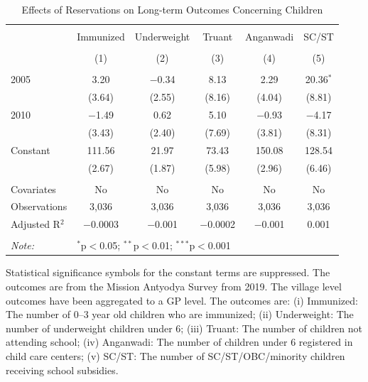 \begin{table}[!htbp]
\centering
\begin{threeparttable}

  \caption{Effects of Reservations on Long-term Outcomes Concerning Children} 
  \label{raj_shrug_children_05_10} 
\scriptsize 
\begin{tabular}{@{\extracolsep{0pt}}lccccc} 
\\[-1.8ex]\hline 
\hline \\[-1.8ex] 
 & Immunized & Underweight & Truant & Anganwadi & SC/ST \\ 
\\[-1.8ex] & (1) & (2) & (3) & (4) & (5)\\ 
\hline \\[-1.8ex] 
 2005 & 3.20 & $-$0.34 & 8.13 & 2.29 & 20.36$^{*}$ \\ 
  & (3.64) & (2.55) & (8.16) & (4.04) & (8.81) \\ 
  2010 & $-$1.49 & 0.62 & 5.10 & $-$0.93 & $-$4.17 \\ 
  & (3.43) & (2.40) & (7.69) & (3.81) & (8.31) \\ 
  Constant & 111.56 & 21.97 & 73.43 & 150.08 & 128.54 \\ 
  & (2.67) & (1.87) & (5.98) & (2.96) & (6.46) \\ 
 \hline \\[-1.8ex] 
Covariates & No & No & No & No & No \\ 
Observations & 3,036 & 3,036 & 3,036 & 3,036 & 3,036 \\ 
Adjusted R$^{2}$ & $-$0.0003 & $-$0.001 & $-$0.0002 & $-$0.001 & 0.001 \\ 
\hline 
\hline \\[-1.8ex] 
\textit{Note:}  & \multicolumn{5}{l}{$^{*}$p$<$0.05; $^{**}$p$<$0.01; $^{***}$p$<$0.001} \\ 
\end{tabular} 
\begin{tablenotes}[flushleft]
\scriptsize
\item[] Statistical significance symbols for the constant terms are suppressed. The outcomes are from the Mission Antyodya Survey from 2019.
                   The village level outcomes have been aggregated to a GP level. The outcomes are:
                    (i) Immunized: The number of 0--3 year old children who are immunized;
                    (ii) Underweight: The number of underweight children under 6;
                    (iii) Truant: The number of children not attending school;
                    (iv) Anganwadi: The number of children under 6 registered in child care centers;
                    (v) SC/ST: The number of SC/ST/OBC/minority children receiving school subsidies.
\end{tablenotes}
\end{threeparttable}
\end{table}
